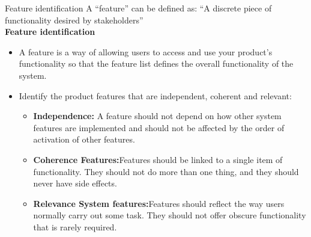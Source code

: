\documentclass{beamer}
\begin{document}
\begin{frame}{Feature identification}
	A “feature” can be defined as: “A discrete piece of functionality desired by stakeholders”\\
	\textbf{Feature identification}
	\begin{itemize}
		\item A feature is a way of allowing users to access and use your product’s 
		functionality so that the feature list defines the overall functionality of the 
		system.
		\item Identify the product features that are independent, coherent and relevant:
		\begin{itemize}
			\item \textbf{Independence:} A feature should not depend on how other system features are 
				implemented and should not be affected by the order of activation of other 
				features.
			\item \textbf{Coherence Features:}Features  should be linked to a single item of functionality. They 
				should not do more than one thing, and they should never have side effects.

			\item \textbf{Relevance System features:}Features  should reflect the way users normally carry out 
				some task. They should not offer obscure functionality that is rarely required.
		\end{itemize}
	\end{itemize}
\end{frame}
\end{document}

